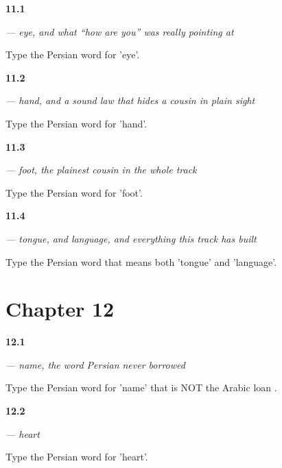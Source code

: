 \noindent\begin{minipage}[t]{\linewidth}
\raggedright
\hypertarget{review-FA-C11-cheshm-meaning}{\textbf{11.1}} \emph{ — eye, and what \textquotedblleft{}how are you\textquotedblright{} was really pointing at}\par
\small Type the Persian word for 'eye'.
\end{minipage}\par\medskip

\noindent\begin{minipage}[t]{\linewidth}
\raggedright
\hypertarget{review-FA-C11-dast-meaning}{\textbf{11.2}} \emph{ — hand, and a sound law that hides a cousin in plain sight}\par
\small Type the Persian word for 'hand'.
\end{minipage}\par\medskip

\noindent\begin{minipage}[t]{\linewidth}
\raggedright
\hypertarget{review-FA-C11-pa-meaning}{\textbf{11.3}} \emph{ — foot, the plainest cousin in the whole track}\par
\small Type the Persian word for 'foot'.
\end{minipage}\par\medskip

\noindent\begin{minipage}[t]{\linewidth}
\raggedright
\hypertarget{review-FA-C11-zaban-meaning}{\textbf{11.4}} \emph{ — tongue, and language, and everything this track has built}\par
\small Type the Persian word that means both 'tongue' and 'language'.
\end{minipage}\par\medskip

\section*{Chapter 12}

\noindent\begin{minipage}[t]{\linewidth}
\raggedright
\hypertarget{review-FA-C12-nam-meaning}{\textbf{12.1}} \emph{ — name, the word Persian never borrowed}\par
\small Type the Persian word for 'name' that is NOT the Arabic loan .
\end{minipage}\par\medskip

\noindent\begin{minipage}[t]{\linewidth}
\raggedright
\hypertarget{review-FA-C12-del-meaning}{\textbf{12.2}} \emph{ — heart}\par
\small Type the Persian word for 'heart'.
\end{minipage}\par\medskip

